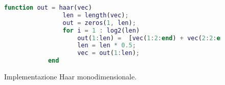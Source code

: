 \documentclass{subfiles}
\begin{document}
\begin{figure}[!h]
    \begin{center}
        \begin{lstlisting}[language = MATLAB]
            function out = haar(vec)
                len = length(vec);
                out = zeros(1, len);
                for i = 1 : log2(len)
                    out(1:len) =  [vec(1:2:end) + vec(2:2:end), vec(1:2:end) - vec(2:2:end)] * 0.5;
                    len = len * 0.5;
                    vec = out(1:len);
            end
        \end{lstlisting}
    \end{center}
    \label{fig:10.1}
    \caption{Implementazione Haar monodimensionale.}
\end{figure}
\end{document}
